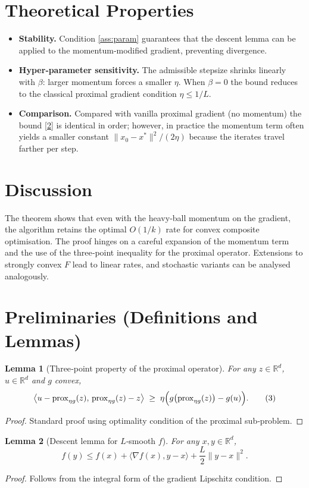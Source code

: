 \documentclass{article}
\newtheorem{lemma}{Lemma}
\newcommand{\prox}{\operatorname{prox}}
\newcommand{\R}{\mathbb{R}}
\begin{document}
\section*{Theoretical Properties}
\begin{itemize}[nosep]
\item \textbf{Stability.} Condition \eqref{ass:param} guarantees that the descent lemma can be applied to the momentum‑modified gradient, preventing divergence.
\item \textbf{Hyper‑parameter sensitivity.} The admissible stepsize shrinks linearly with $\beta$: larger momentum forces a smaller $\eta$. When $\beta=0$ the bound reduces to the classical proximal gradient condition $\eta\le 1/L$.
\item \textbf{Comparison.} Compared with vanilla proximal gradient (no momentum) the bound \eqref{2} is identical in order; however, in practice the momentum term often yields a smaller constant $\|x_{0}-x^{*}\|^{2}/(2\eta)$ because the iterates travel farther per step.
\end{itemize}

\section*{Discussion}
The theorem shows that even with the heavy‑ball momentum on the gradient, the algorithm retains the optimal $O(1/k)$ rate for convex composite optimisation. The proof hinges on a careful expansion of the momentum term and the use of the three‑point inequality for the proximal operator. Extensions to strongly convex $F$ lead to linear rates, and stochastic variants can be analysed analogously.

\newpage
\section*{Preliminaries (Definitions and Lemmas)}
\begin{lemma}[Three‑point property of the proximal operator]\label{lem:three}
For any $z\in\R^{d}$, $u\in\R^{d}$ and $g$ convex,
\[
\bigl\langle u-\prox_{\eta g}(z),\,\prox_{\eta g}(z)-z\bigr\rangle
\;\ge\;\eta\Bigl(g\bigl(\prox_{\eta g}(z)\bigr)-g(u)\Bigr).
\tag{3}
\]
\end{lemma}
\begin{proof}
Standard proof using optimality condition of the proximal sub‑problem. \qedhere
\end{proof}

\begin{lemma}[Descent lemma for $L$‑smooth $f$]\label{lem:descent}
For any $x,y\in\R^{d}$,
\[
f(y)\le f(x)+\langle\nabla f(x),y-x\rangle+\frac{L}{2}\|y-x\|^{2}.
\tag{4}
\]
\end{lemma}
\begin{proof}
Follows from the integral form of the gradient Lipschitz condition. \qedhere
\end{proof}
\end{document}
